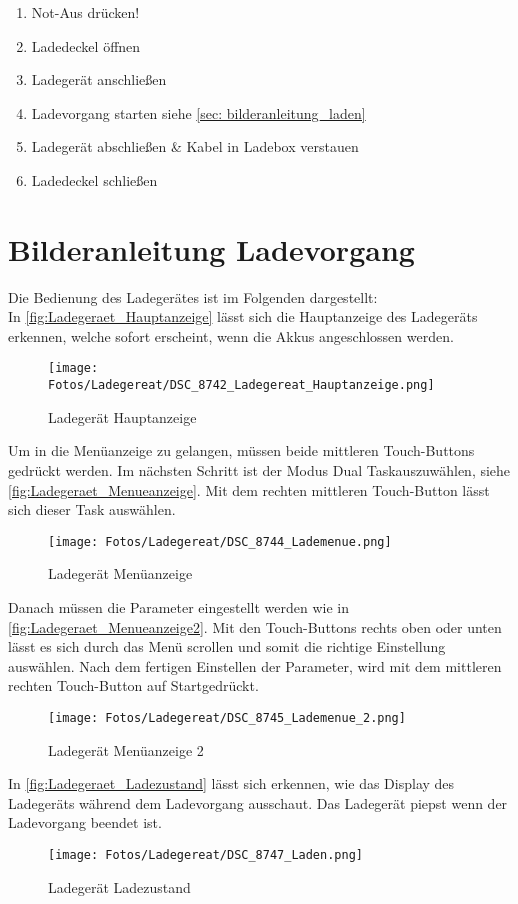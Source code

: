 \begin{enumerate}
    \item Not-Aus drücken!
    \item Ladedeckel öffnen
    \item Ladegerät anschließen
    \item Ladevorgang starten siehe \ref{sec: bilderanleitung_laden}
    \item Ladegerät abschließen \& Kabel in Ladebox verstauen
    \item Ladedeckel schließen
\end{enumerate}

\newpage
\section{Bilderanleitung Ladevorgang \label{sec: bilderanleitung_laden}}
Die Bedienung des Ladegerätes ist im Folgenden dargestellt: \\

In \autoref{fig:Ladegeraet_Hauptanzeige} lässt sich die Hauptanzeige des Ladegeräts erkennen, welche 
sofort erscheint, wenn die Akkus angeschlossen werden. 

\begin{figure}[H]
    \centering
    \texttt{[image: Fotos/Ladegereat/DSC\_8742\_Ladegereat\_Hauptanzeige.png]}
    \caption{Ladegerät Hauptanzeige \label{fig:Ladegeraet_Hauptanzeige}}
\end{figure}

Um in die Menüanzeige zu gelangen, müssen beide mittleren Touch-Buttons gedrückt werden.
Im nächsten Schritt ist der Modus \glqq Dual Task\grqq auszuwählen, siehe \autoref{fig:Ladegeraet_Menueanzeige}. Mit dem rechten mittleren Touch-Button lässt sich 
dieser Task auswählen. 
\begin{figure}[H]
    \centering
    \texttt{[image: Fotos/Ladegereat/DSC\_8744\_Lademenue.png]}
    \caption{Ladegerät Menüanzeige \label{fig:Ladegeraet_Menueanzeige}}
\end{figure}

Danach müssen die Parameter eingestellt werden wie in \autoref{fig:Ladegeraet_Menueanzeige2}. Mit den Touch-Buttons rechts oben oder unten lässt es sich durch das Menü 
scrollen und somit die richtige Einstellung auswählen. Nach dem fertigen Einstellen der Parameter, wird mit dem mittleren rechten Touch-Button auf \glqq Start\grqq gedrückt. 
\begin{figure}[H]
    \centering
    \texttt{[image: Fotos/Ladegereat/DSC\_8745\_Lademenue\_2.png]}
    \caption{Ladegerät Menüanzeige 2 \label{fig:Ladegeraet_Menueanzeige2}}
\end{figure}

In \autoref{fig:Ladegeraet_Ladezustand} lässt sich erkennen, wie das Display des Ladegeräts während dem Ladevorgang ausschaut.
Das Ladegerät piepst wenn der Ladevorgang beendet ist. 
\begin{figure}[H]
    \centering
    \texttt{[image: Fotos/Ladegereat/DSC\_8747\_Laden.png]}
    \caption{Ladegerät Ladezustand \label{fig:Ladegeraet_Ladezustand}}
\end{figure}


